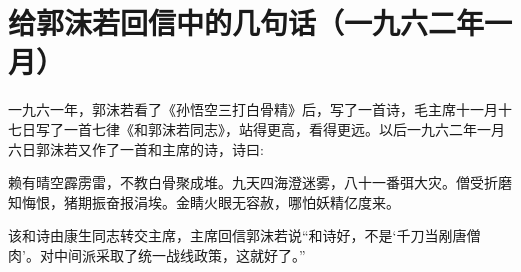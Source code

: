 \section{给郭沫若回信中的几句话（一九六二年一月）}


一九六一年，郭沫若看了《孙悟空三打白骨精》后，写了一首诗，毛主席十一月十七日写了一首七律《和郭沫若同志》，站得更高，看得更远。以后一九六二年一月六日郭沫若又作了一首和主席的诗，诗曰:

赖有晴空霹雳雷，不教白骨聚成堆。九天四海澄迷雾，八十一番弭大灾。僧受折磨知悔恨，猪期振奋报涓埃。金睛火眼无容赦，哪怕妖精亿度来。

该和诗由康生同志转交主席，主席回信郭沫若说“和诗好，不是‘千刀当剐唐僧肉’。对中间派采取了统一战线政策，这就好了。”


